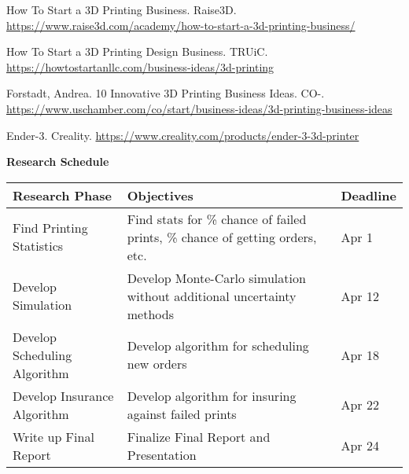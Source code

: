 \documentclass[11pt]{article}
\begin{document}

\begin{thebibliography}{5}
    \hangindent=0.5in How To Start a 3D Printing Business. Raise3D. \href{https://www.raise3d.com/academy/how-to-start-a-3d-printing-business/}{https://www.raise3d.com/academy/how-to-start-a-3d-printing-business/}

    \hangindent=0.5in How To Start a 3D Printing Design Business. TRUiC. \href{https://howtostartanllc.com/business-ideas/3d-printing}{https://howtostartanllc.com/business-ideas/3d-printing}

    \hangindent=0.5in Forstadt, Andrea. 10 Innovative 3D Printing Business Ideas. CO-. \href{https://www.uschamber.com/co/start/business-ideas/3d-printing-business-ideas}{https://www.uschamber.com/co/start/business-ideas/3d-printing-business-ideas}

    \hangindent=0.5in Ender-3. Creality. \href{https://www.creality.com/products/ender-3-3d-printer}{https://www.creality.com/products/ender-3-3d-printer}
\end{thebibliography}

\bigbreak


\begin{center}
    \LARGE
    \textbf{Research Schedule}

    \begin{tabular}{| p{2.5in} | p{3in} | p{1.25in} |}
        \hline
        Research Phase & Objectives & Deadline \\
        \hline
        Find Printing Statistics & Find stats for \% chance of failed prints, \% chance of getting orders, etc. & Apr 1 \\
        \hline
        Develop Simulation & Develop Monte-Carlo simulation without additional uncertainty methods & Apr 12 \\
        \hline
        Develop Scheduling Algorithm & Develop algorithm for scheduling new orders & Apr 18 \\
        \hline
        Develop Insurance Algorithm & Develop algorithm for insuring against failed prints & Apr 22 \\
        \hline
        Write up Final Report & Finalize Final Report and Presentation & Apr 24 \\
        \hline
    \end{tabular}
\end{center}
\end{document}
